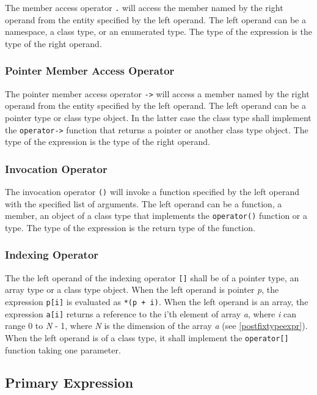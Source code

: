 \documentclass[a4paper,oneside,11pt]{article}
\begin{document}
The member access operator \texttt{.} will access the member named by the right operand from the entity specified by the left operand.
The left operand can be a namespace, a class type, or an enumerated type.
The type of the expression is the type of the right operand.

\subsubsection{Pointer Member Access Operator}\label{ptrmember}

The pointer member access operator \texttt{->} will access a member named by the right operand from the entity specified by the left operand.
The left operand can be a pointer type or class type object. In the latter case the class type shall implement the \texttt{operator->}
function that returns a pointer or another class type object. The type of the expression is the type of the right operand.

\subsubsection{Invocation Operator}\label{invocation}

The invocation operator \texttt{()} will invoke a function specified by the left operand with the specified list of arguments.
The left operand can be a function, a member, an object of a class type that implements the \texttt{operator()} function or a type.
The type of the expression is the return type of the function.

\subsubsection{Indexing Operator}\label{indexing}

The the left operand of the indexing operator \texttt{[]} shall be of a pointer type, an array type or a class type object.
When the left operand is pointer \emph{p}, the expression \texttt{p[i]} is evaluated as \texttt{*(p + i)}.
When the left operand is an array, the expression \texttt{a[i]} returns a reference to the i'th element of array \emph{a},
where \emph{i} can range 0 to \emph{N} - 1, where \emph{N} is the dimension of the array \emph{a} (see \ref{postfixtypeexpr}).
When the left operand is of a class type, it shall implement the \texttt{operator[]} function taking one parameter.

\subsection{Primary Expression}\label{primary}
\end{document}
